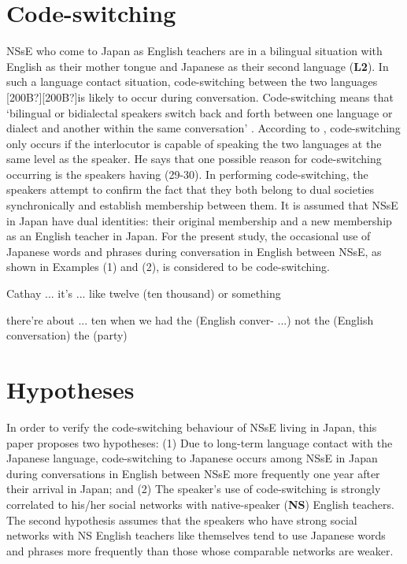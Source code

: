 \documentclass[output=paper]{LSP/langsci}
\begin{document}
\section{Code-switching}
NSsE who come to Japan as English teachers are in a bilingual situation with English as their mother tongue and Japanese as their second language (\textbf{L2}). In such a language contact situation, code-switching between the two languages [200B?][200B?]is likely to occur during conversation. Code-switching means that ‘bilingual or bidialectal speakers switch back and forth between one language or dialect and another within the same conversation’ \citep[23]{trudgill_glossary_2003}. According to \citet[26]{azuma_shakai_1997}, code-switching only occurs if the interlocutor is capable of speaking the two languages at the same level as the speaker. He says that one possible reason for code-switching occurring is the speakers having  (29-30). In performing code-switching, the speakers attempt to confirm the fact that they both belong to dual societies synchronically and establish membership between them. It is assumed that NSsE in Japan have dual identities: their original membership and a new membership as an English teacher in Japan. For the present study, the occasional use of Japanese words and phrases during conversation in English between NSsE, as shown in Examples (1) and (2), is considered to be code-switching.

\begin{exe}
\label{ex:1}
\ex Cathay ... it’s ... like twelve  (ten thousand) or something
\end{exe}

\begin{exe}
\label{ex:2} 
\ex there’re about ... ten when we had the  (English conver- ...) not the    (English conversation) the  (party)
\end{exe}

\section{Hypotheses}
In order to verify the code-switching behaviour of NSsE living in Japan, this paper proposes two hypotheses: (1) Due to long-term language contact with the Japanese language, code-switching to Japanese occurs among NSsE in Japan during conversations in English between NSsE more frequently one year after their arrival in Japan; and (2) The speaker’s use of code-switching is strongly correlated to his/her social networks with native-speaker (\textbf{NS}) English teachers. The second hypothesis assumes that the speakers who have strong social networks with NS English teachers like themselves tend to use Japanese words and phrases more frequently than those whose comparable networks are weaker.
\end{document}
